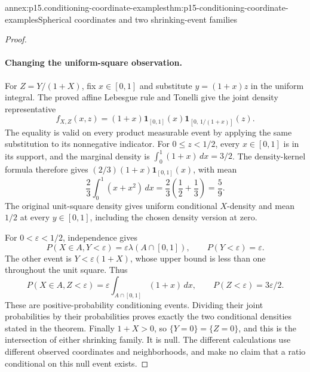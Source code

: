 \begin{annexitem}{annex:p15.conditioning-coordinate-examples}{thm:p15-conditioning-coordinate-examples}{Spherical coordinates and two shrinking-event families}
\begin{proof}
\paragraph{Changing the uniform-square observation.}
For \(Z=Y/(1+X)\), fix \(x\in[0,1]\) and substitute
\(y=(1+x)z\) in the uniform integral.
The proved affine Lebesgue rule and Tonelli give the joint
density representative
\[
 f_{X,Z}(x,z)=(1+x)\mathbf1_{[0,1]}(x)
                         \mathbf1_{[0,\,1/(1+x)]}(z).
\]
The equality is valid on every product measurable event by
applying the same substitution to its nonnegative indicator.
For \(0\leq z<1/2\), every \(x\in[0,1]\) is in its support,
and the marginal density is \(\int_0^1(1+x)\,dx=3/2\).
The density-kernel formula therefore gives
\((2/3)(1+x)\mathbf1_{[0,1]}(x)\), with mean
\[
                       \frac23\int_0^1(x+x^2)\,dx
                           =\frac23\left(\frac12+\frac13\right)=\frac59.
\]
The original unit-square density gives uniform conditional
\(X\)-density and mean \(1/2\) at every \(y\in[0,1]\), including
the chosen density version at zero.

For \(0<\varepsilon<1/2\), independence gives
\[
 P(X\in A,Y<\varepsilon)=\varepsilon\lambda(A\cap[0,1]),\qquad
 P(Y<\varepsilon)=\varepsilon.
\]
The other event is \(Y<\varepsilon(1+X)\), whose upper bound is
less than one throughout the unit square. Thus
\[
 P(X\in A,Z<\varepsilon)
       =\varepsilon\int_{A\cap[0,1]}(1+x)\,dx,\qquad
 P(Z<\varepsilon)=3\varepsilon/2 .
\]
These are positive-probability conditioning events. Dividing
their joint probabilities by their probabilities proves exactly
the two conditional densities stated in the theorem.
Finally \(1+X>0\), so \(\{Y=0\}=\{Z=0\}\), and this is the
intersection of either shrinking family.
It is null. The different calculations use different observed
coordinates and neighborhoods, and make no claim that a
ratio conditional on this null event exists.
\end{proof}
\end{annexitem}
